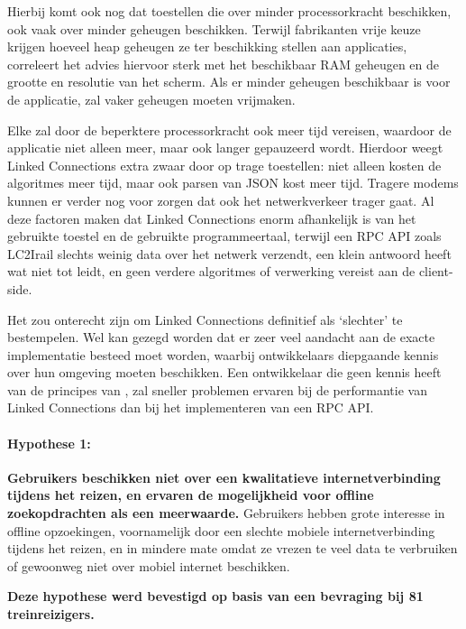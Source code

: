 Hierbij komt ook nog dat toestellen die over minder processorkracht beschikken, ook vaak over minder geheugen beschikken. Terwijl fabrikanten vrije keuze krijgen hoeveel heap geheugen ze ter beschikking stellen aan applicaties, correleert het advies hiervoor sterk met het beschikbaar RAM geheugen en de grootte en resolutie van het scherm. Als er minder geheugen beschikbaar is voor de applicatie, zal  vaker geheugen moeten vrijmaken. 

Elke  zal door de beperktere processorkracht ook meer tijd vereisen, waardoor de applicatie niet alleen meer, maar ook langer gepauzeerd wordt. Hierdoor weegt Linked Connections extra zwaar door op trage toestellen: niet alleen kosten de algoritmes meer tijd, maar ook parsen van JSON kost meer tijd. Tragere modems kunnen er verder nog voor zorgen dat ook het netwerkverkeer trager gaat. Al deze factoren maken dat Linked Connections enorm afhankelijk is van het gebruikte toestel en de gebruikte programmeertaal, terwijl een RPC API zoals LC2Irail slechts weinig data over het netwerk verzendt, een klein antwoord heeft wat niet tot  leidt, en geen verdere algoritmes of verwerking vereist aan de client-side. 

Het zou onterecht zijn om Linked Connections definitief als `slechter' te bestempelen. Wel kan gezegd worden dat er zeer veel aandacht aan de exacte implementatie besteed moet worden, waarbij ontwikkelaars diepgaande kennis over hun omgeving moeten beschikken. Een ontwikkelaar die geen kennis heeft van de principes van , zal sneller problemen ervaren bij de performantie van Linked Connections dan bij het implementeren van een RPC API.

\paragraph{Hypothese 1:} \textbf{Gebruikers beschikken niet over een kwalitatieve internetverbinding tijdens het reizen, en ervaren de mogelijkheid voor offline zoekopdrachten als een meerwaarde.}
	Gebruikers hebben grote interesse in offline opzoekingen, voornamelijk door een slechte mobiele internetverbinding tijdens het reizen, en in mindere mate omdat ze vrezen te veel data te verbruiken of gewoonweg niet over mobiel internet beschikken.
	
\textbf{Deze hypothese werd bevestigd op basis van een bevraging bij 81 treinreizigers.}


